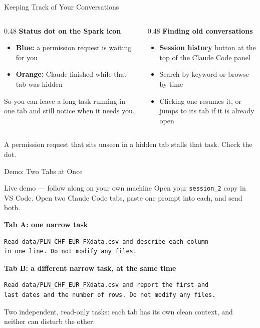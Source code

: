 \documentclass[aspectratio=169, 11pt]{beamer}
\begin{document}
\begin{frame}{Keeping Track of Your Conversations}
  \begin{columns}[T]
    \begin{column}{0.48\textwidth}
      \textbf{Status dot on the Spark icon}
      \begin{itemize}
        \item \textbf{Blue:} a permission request is waiting for you
        \item \textbf{Orange:} Claude finished while that tab was hidden
      \end{itemize}
      \vspace{0.3em}
      So you can leave a long task running in one tab and still notice when it needs you.
    \end{column}
    \begin{column}{0.48\textwidth}
      \textbf{Finding old conversations}
      \begin{itemize}
        \item \textbf{Session history} button at the top of the Claude Code panel
        \item Search by keyword or browse by time
        \item Clicking one resumes it, or jumps to its tab if it is already open
      \end{itemize}
    \end{column}
  \end{columns}

  \vspace{0.6em}
  \alert{A permission request that sits unseen in a hidden tab stalls that task.} Check the dot.
\end{frame}

\begin{frame}[fragile]{Demo: Two Tabs at Once}
  \begin{alertblock}{Live demo --- follow along on your own machine}
    Open your \texttt{session\_2} copy in VS Code. Open two Claude Code tabs, paste one prompt into each, and send both.
  \end{alertblock}

  \vspace{0.2em}
  \textbf{Tab A: one narrow task}
  \begin{lstlisting}[basicstyle=\ttfamily\footnotesize]
Read data/PLN_CHF_EUR_FXdata.csv and describe each column
in one line. Do not modify any files.
  \end{lstlisting}

  \vspace{0.2em}
  \textbf{Tab B: a different narrow task, at the same time}
  \begin{lstlisting}[basicstyle=\ttfamily\footnotesize]
Read data/PLN_CHF_EUR_FXdata.csv and report the first and
last dates and the number of rows. Do not modify any files.
  \end{lstlisting}

  {\footnotesize Two independent, read-only tasks: each tab has its own clean context, and neither can disturb the other.}
\end{frame}
\end{document}
